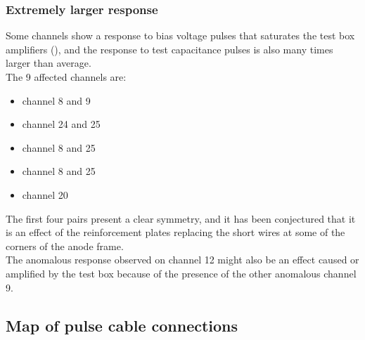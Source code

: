 \subsubsection{Extremely larger response}
\label{sssec:ExtremelyLargerResponse}

Some channels show a response to bias voltage pulses that saturates the test
box amplifiers (), and the response to test capacitance pulses is also
many times larger than average.
\\
The 9 affected channels are:
\begin{itemize}
  \item {}  channel  8 and 9 
  \item {}  channel 24 and 25
  \item {}  channel  8 and 25
  \item {}  channel  8 and 25
  \item {}  channel 20       
\end{itemize}
The first four pairs present a clear symmetry, and it has been conjectured that
it is an effect of the reinforcement plates replacing the short wires at some of
the corners of the anode frame.
\\
The anomalous response observed on   channel 12 might
also be an effect caused or amplified by the test box because of the presence of
the other anomalous channel 9.



\subsection{Map of pulse cable connections}
\label{ssec:PulseCableMap}

